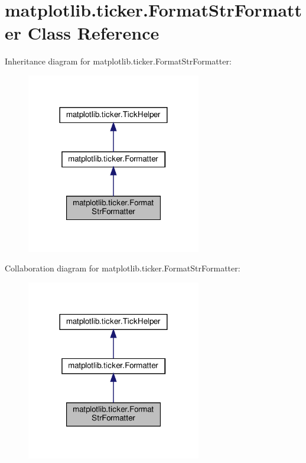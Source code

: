 \hypertarget{classmatplotlib_1_1ticker_1_1FormatStrFormatter}{}\section{matplotlib.\+ticker.\+Format\+Str\+Formatter Class Reference}
\label{classmatplotlib_1_1ticker_1_1FormatStrFormatter}


Inheritance diagram for matplotlib.\+ticker.\+Format\+Str\+Formatter\+:
\nopagebreak
\begin{figure}[H]
\begin{center}
\leavevmode
\includegraphics[width=216pt]{classmatplotlib_1_1ticker_1_1FormatStrFormatter__inherit__graph}
\end{center}
\end{figure}


Collaboration diagram for matplotlib.\+ticker.\+Format\+Str\+Formatter\+:
\nopagebreak
\begin{figure}[H]
\begin{center}
\leavevmode
\includegraphics[width=216pt]{classmatplotlib_1_1ticker_1_1FormatStrFormatter__coll__graph}
\end{center}
\end{figure}

